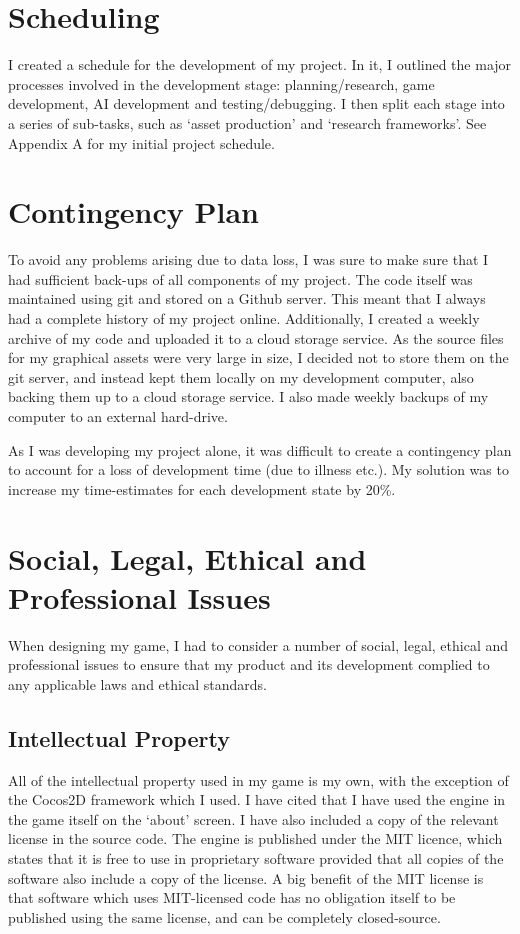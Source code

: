 \documentclass[a4paper,oneside]{report}
\begin{document}
\section{Scheduling}

I created a schedule for the development of my project. In it, I outlined the major processes involved in the development stage: planning/research, game development, AI development and testing/debugging. I then split each stage into a series of sub-tasks, such as `asset production' and `research frameworks'. See Appendix A for my initial project schedule.

\section{Contingency Plan}

To avoid any problems arising due to data loss, I was sure to make sure that I had sufficient back-ups of all components of my project. The code itself was maintained using git and stored on a Github server. This meant that I always had a complete history of my project online. Additionally, I created a weekly archive of my code and uploaded it to a cloud storage service. As the source files for my graphical assets were very large in size, I decided not to store them on the git server, and instead kept them locally on my development computer, also backing them up to a cloud storage service. I also made weekly backups of my computer to an external hard-drive.

As I was developing my project alone, it was difficult to create a contingency plan to account for a loss of development time (due to illness etc.). My solution was to increase my time-estimates for each development state by 20\%.
	
\section{Social, Legal, Ethical and Professional Issues}

When designing my game, I had to consider a number of social, legal, ethical and professional issues to ensure that my product and its development complied to any applicable laws and ethical standards.

\subsection{Intellectual Property}

All of the intellectual property used in my game is my own, with the exception of the Cocos2D framework which I used. I have cited that I have used the engine in the game itself on the `about' screen. I have also included a copy of the relevant license in the source code. The engine is published under the MIT licence, which states that it is free to use in proprietary software provided that all copies of the software also include a copy of the license. A big benefit of the MIT license is that software which uses MIT-licensed code has no obligation itself to be published using the same license, and can be completely closed-source.
\end{document}
